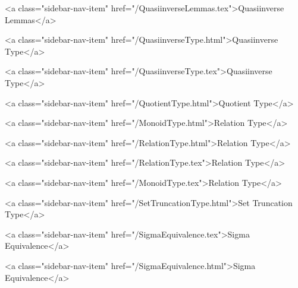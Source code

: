       
    
      
        
          <a class="sidebar-nav-item" href="/QuasiinverseLemmas.tex">Quasiinverse Lemmas</a>
        
      
    
      
        
          <a class="sidebar-nav-item" href="/QuasiinverseType.html">Quasiinverse Type</a>
        
      
    
      
        
          <a class="sidebar-nav-item" href="/QuasiinverseType.tex">Quasiinverse Type</a>
        
      
    
      
        
          <a class="sidebar-nav-item" href="/QuotientType.html">Quotient Type</a>
        
      
    
      
        
          <a class="sidebar-nav-item" href="/MonoidType.html">Relation Type</a>
        
      
    
      
        
          <a class="sidebar-nav-item" href="/RelationType.html">Relation Type</a>
        
      
    
      
        
          <a class="sidebar-nav-item" href="/RelationType.tex">Relation Type</a>
        
      
    
      
        
          <a class="sidebar-nav-item" href="/MonoidType.tex">Relation Type</a>
        
      
    
      
        
          <a class="sidebar-nav-item" href="/SetTruncationType.html">Set Truncation Type</a>
        
      
    
      
        
          <a class="sidebar-nav-item" href="/SigmaEquivalence.tex">Sigma Equivalence</a>
        
      
    
      
        
          <a class="sidebar-nav-item" href="/SigmaEquivalence.html">Sigma Equivalence</a>
        
